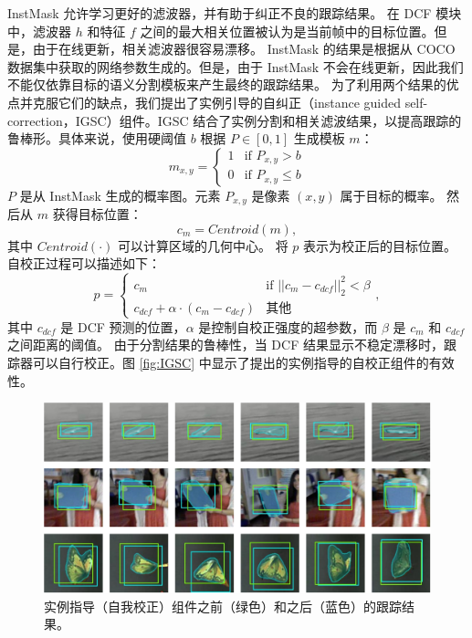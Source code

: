 InstMask 允许学习更好的滤波器，并有助于纠正不良的跟踪结果。
在 DCF 模块中，滤波器 $h$ 和特征 $f$ 之间的最大相关位置被认为是当前帧中的目标位置。但是，由于在线更新，相关滤波器很容易漂移。
InstMask 的结果是根据从 COCO 数据集中获取的网络参数生成的。但是，由于 InstMask 不会在线更新，因此我们不能仅依靠目标的语义分割模板来产生最终的跟踪结果。
为了利用两个结果的优点并克服它们的缺点，我们提出了实例引导的自纠正（instance guided self-correction，IGSC）组件。IGSC 结合了实例分割和相关滤波结果，以提高跟踪的鲁棒形。具体来说，使用硬阈值 $b$ 根据 $P\in [0, 1]$ 生成模板 $m$：
\begin{equation}
m_{x,y} = \left\{ \begin{array}{ll}
 1 & \textrm{if $P_{x,y} > b$}\\
 0 & \textrm{if $P_{x,y} \le b$}
 \end{array} \right.
\end{equation}
$P$ 是从 InstMask 生成的概率图。元素 $P_{x,y}$ 是像素 $(x,y)$ 属于目标的概率。
然后从 $m$ 获得目标位置：
\begin{equation}
c_{m} = Centroid(m),
\end{equation}
其中 $Centroid(\mathord{\cdot})$ 可以计算区域的几何中心。
将 $p$ 表示为校正后的目标位置。
自校正过程可以描述如下：
\begin{equation}
p = \left\{ \begin{array}{ll}
 c_{m} & \textrm{if $||c_{m}-c_{dcf}||_2^2 < \beta$}\\
 c_{dcf} + \alpha \cdot (c_{m}-c_{dcf}) & \textrm{其他}
 \end{array} \right.,
\end{equation}
其中 $c_{dcf}$ 是 DCF 预测的位置，$\alpha$ 是控制自校正强度的超参数，而 $\beta$ 是 $c_{m}$ 和 $c_{dcf}$ 之间距离的阈值。
由于分割结果的鲁棒性，当 DCF 结果显示不稳定漂移时，跟踪器可以自行校正。图 \ref{fig:IGSC} 中显示了提出的实例指导的自校正组件的有效性。

\begin{figure}
\centering
\includegraphics[width=1.0\textwidth]{Img/IGCF/cog.pdf}
\caption{实例指导（自我校正）组件之前（绿色）和之后（蓝色）的跟踪结果。}
\end{figure}


